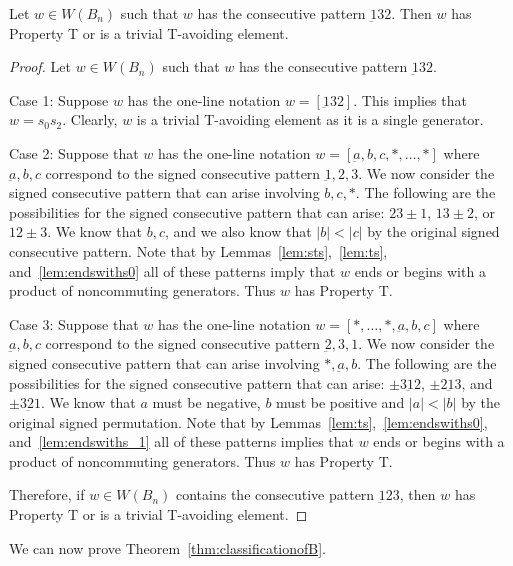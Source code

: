 \begin{lemma}\label{lem:132}
Let $w \in W(B_n)$ such that $w$ has the consecutive pattern $\underbar{1}32$. Then $w$ has Property T or is a trivial T-avoiding element.
\begin{proof}
	Let $w \in W(B_n)$ such that $w$ has the consecutive pattern $\underbar{1}32$.
	
	Case 1: Suppose $w$ has the one-line notation $w=[\underbar{1}32]$. This implies that $w=s_0s_2$. Clearly, $w$ is a trivial T-avoiding element as it is a single generator.
	
	Case 2: Suppose that $w$ has the one-line notation $w=[\underbar{a},b,c, \ast, \ldots, \ast]$ where $\underbar{a},b,c$ correspond to the signed consecutive pattern $\underbar{1},2,3$. We now consider the signed consecutive pattern that can arise involving $b,c, \ast$. The following are the possibilities for the signed consecutive pattern that can arise: $23\pm1$, $13 \pm2$, or $12\pm3$. We know that $b,c$, and we also know that $|b|<|c|$ by the original signed consecutive pattern. Note that by Lemmas~\ref{lem:sts},~\ref{lem:ts}, and~\ref{lem:endswiths0} all of these patterns imply that $w$ ends or begins with a product of noncommuting generators. Thus $w$ has Property T.
	
	Case 3: Suppose that $w$ has the one-line notation $w=[\ast, \ldots, \ast, \underbar{a},b,c]$ where $\underbar{a},b,c$ correspond to the signed consecutive pattern $\underbar{2},3,1$. We now consider the signed consecutive pattern that can arise involving $\ast, \underbar{a}, b$. The following are the possibilities for the signed consecutive pattern that can arise: $\pm3 \underbar{1} 2$, $\pm 2 \underbar{1} 3$, and $\pm 3 \underbar{2} 1$. We know that $a$ must be negative, $b$ must be positive and $|a|<|b|$ by the original signed permutation. Note that by Lemmas~\ref{lem:ts},~\ref{lem:endswiths0}, and~\ref{lem:endswiths_1} all of these patterns implies that $w$ ends or begins with a product of noncommuting generators. Thus $w$ has Property T. 

	Therefore, if $w \in W(B_n)$ contains the consecutive pattern $\underbar{1}23$, then $w$ has Property T or is a trivial T-avoiding element.
\end{proof}	
\end{lemma}

We can now prove Theorem~\ref{thm:classificationofB}.

